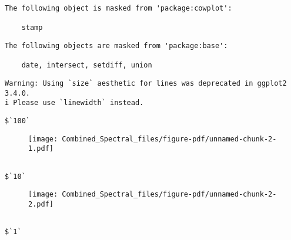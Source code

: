 \documentclass[
  letterpaper,
  DIV=11,
  numbers=noendperiod]{scrartcl}
\newenvironment{Shaded}{\begin{snugshade}}{\end{snugshade}}
\newcommand{\FunctionTok}[1]{\textcolor[rgb]{0.28,0.35,0.67}{#1}}
\newcommand{\NormalTok}[1]{\textcolor[rgb]{0.00,0.23,0.31}{#1}}
\newcommand{\OtherTok}[1]{\textcolor[rgb]{0.00,0.23,0.31}{#1}}
\newcommand{\SpecialCharTok}[1]{\textcolor[rgb]{0.37,0.37,0.37}{#1}}
\newcommand{\StringTok}[1]{\textcolor[rgb]{0.13,0.47,0.30}{#1}}
\begin{document}
\begin{verbatim}
The following object is masked from 'package:cowplot':

    stamp
\end{verbatim}

\begin{verbatim}
The following objects are masked from 'package:base':

    date, intersect, setdiff, union
\end{verbatim}

\begin{Shaded}
\end{Shaded}

\begin{verbatim}
Warning: Using `size` aesthetic for lines was deprecated in ggplot2 3.4.0.
i Please use `linewidth` instead.
\end{verbatim}

\begin{verbatim}
$`100`
\end{verbatim}

\begin{figure}[H]

{\centering \texttt{[image: Combined\_Spectral\_files/figure-pdf/unnamed-chunk-2-1.pdf]}

}

\end{figure}

\begin{verbatim}

$`10`
\end{verbatim}

\begin{figure}[H]

{\centering \texttt{[image: Combined\_Spectral\_files/figure-pdf/unnamed-chunk-2-2.pdf]}

}

\end{figure}

\begin{verbatim}

$`1`
\end{verbatim}
\end{document}
